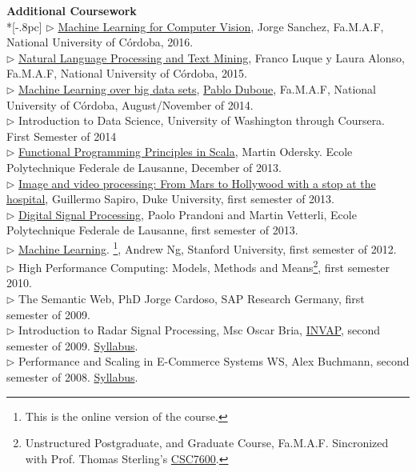 \documentclass[letter,11pt,english]{article}
\begin{document}
{\large \bf Additional Coursework}\\ *[-.8pc]
\underline{\hspace{6in}}
$\triangleright$ \href{http://www.famaf.unc.edu.ar/~jsanchez/aavc16/}{Machine Learning for Computer Vision}, Jorge Sanchez, Fa.M.A.F, National University of C\'ordoba, 2016.\\
$\triangleright$ \href{http://cs.famaf.unc.edu.ar/wiki/materias/pln}{Natural Language Processing and Text Mining}, Franco Luque y Laura Alonso, Fa.M.A.F, National University of C\'ordoba, 2015.\\
$\triangleright$ \href{http://aprendizajengrande.net/}{Machine Learning over big data sets},  \href{http://duboue.net/}{Pablo Duboue}, Fa.M.A.F, National University of C\'ordoba, August/November of 2014.\\
$\triangleright$ Introduction to Data Science, University of Washington through Coursera. First Semester
of 2014\\
$\triangleright$ \href{https://www.coursera.org/course/progfun}{Functional Programming Principles in Scala},  Martin Odersky. Ecole Polytechnique Federale de Lausanne, December of 2013.  \\
$\triangleright$ \href{https://www.coursera.org/course/images}{Image and video processing: From Mars to Hollywood with a stop at the hospital}, Guillermo Sapiro, Duke University, first semester of 2013. \\
$\triangleright$ \href{https://www.coursera.org/course/dsp}{Digital Signal Processing}, Paolo Prandoni and Martin Vetterli, Ecole Polytechnique Federale de Lausanne, first semester of 2013.\\
$\triangleright$ \href{http://www.ml-class.org}{Machine Learning}. \footnote{This is the online version of the course.}, Andrew Ng, Stanford University, first semester of 2012. \\
$\triangleright$ High Performance Computing: Models, Methods and Means\footnote{Unstructured Postgraduate,
and Graduate Course, Fa.M.A.F. Sincronized with Prof. Thomas Sterling's 
\href{https://www.cct.lsu.edu/csc7600/Home.html}{CSC7600}.}, first semester 2010.\\
$\triangleright$ The Semantic Web, PhD Jorge Cardoso, SAP Research Germany, first semester of 2009.\\
$\triangleright$ Introduction to Radar Signal Processing, Msc Oscar Bria, 
\href{http://www.invap.com.ar/en/}{INVAP}, second semester of 2009. \href{http://postgrado.info.unlp.edu.ar/Cursos/Cursos/11-2011_Introduccion_al_Procesamiento_de_Senales_Radar.pdf}{Syllabus}.\\
$\triangleright$ Performance and Scaling in E-Commerce Systems WS, Alex Buchmann, second semester of 2008. 
\href{http://www.dvs.tu-darmstadt.de/teaching/perf/2008/}{Syllabus}.\\
\end{document}
